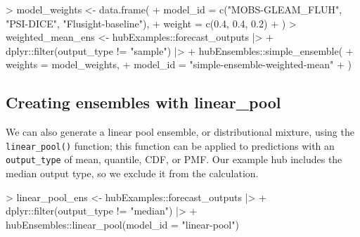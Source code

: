 \documentclass[
  letterpaper,
  DIV=11,
  numbers=noendperiod]{scrartcl}
\newenvironment{Shaded}{\begin{snugshade}}{\end{snugshade}}
\newcommand{\AttributeTok}[1]{\textcolor[rgb]{0.40,0.45,0.13}{#1}}
\newcommand{\FloatTok}[1]{\textcolor[rgb]{0.68,0.00,0.00}{#1}}
\newcommand{\FunctionTok}[1]{\textcolor[rgb]{0.28,0.35,0.67}{#1}}
\newcommand{\NormalTok}[1]{\textcolor[rgb]{0.00,0.23,0.31}{#1}}
\newcommand{\OtherTok}[1]{\textcolor[rgb]{0.00,0.23,0.31}{#1}}
\newcommand{\SpecialCharTok}[1]{\textcolor[rgb]{0.37,0.37,0.37}{#1}}
\newcommand{\StringTok}[1]{\textcolor[rgb]{0.13,0.47,0.30}{#1}}
\begin{document}
\begin{Shaded}
\begin{Highlighting}[]
\SpecialCharTok{\textgreater{}}\NormalTok{ model\_weights }\OtherTok{\textless{}{-}} \FunctionTok{data.frame}\NormalTok{(}
\SpecialCharTok{+}     \AttributeTok{model\_id =} \FunctionTok{c}\NormalTok{(}\StringTok{"MOBS{-}GLEAM\_FLUH"}\NormalTok{, }\StringTok{"PSI{-}DICE"}\NormalTok{, }\StringTok{"Flusight{-}baseline"}\NormalTok{),}
\SpecialCharTok{+}     \AttributeTok{weight =} \FunctionTok{c}\NormalTok{(}\FloatTok{0.4}\NormalTok{, }\FloatTok{0.4}\NormalTok{, }\FloatTok{0.2}\NormalTok{)}
\SpecialCharTok{+}\NormalTok{   )}
\SpecialCharTok{\textgreater{}}\NormalTok{ weighted\_mean\_ens }\OtherTok{\textless{}{-}}\NormalTok{ hubExamples}\SpecialCharTok{::}\NormalTok{forecast\_outputs }\SpecialCharTok{|\textgreater{}}
\SpecialCharTok{+}\NormalTok{     dplyr}\SpecialCharTok{::}\FunctionTok{filter}\NormalTok{(output\_type }\SpecialCharTok{!=} \StringTok{"sample"}\NormalTok{) }\SpecialCharTok{|\textgreater{}}
\SpecialCharTok{+}\NormalTok{     hubEnsembles}\SpecialCharTok{::}\FunctionTok{simple\_ensemble}\NormalTok{(}
\SpecialCharTok{+}       \AttributeTok{weights =}\NormalTok{ model\_weights,}
\SpecialCharTok{+}       \AttributeTok{model\_id =} \StringTok{"simple{-}ensemble{-}weighted{-}mean"}
\SpecialCharTok{+}\NormalTok{     )}
\end{Highlighting}
\end{Shaded}

\subsection{Creating ensembles with
linear\_pool}\label{creating-ensembles-with-linear_pool}

We can also generate a linear pool ensemble, or distributional mixture,
using the \texttt{linear\_pool()} function; this function can be applied
to predictions with an \texttt{output\_type} of mean, quantile, CDF, or
PMF. Our example hub includes the median output type, so we exclude it
from the calculation.

\begin{Shaded}
\begin{Highlighting}[]
\SpecialCharTok{\textgreater{}}\NormalTok{ linear\_pool\_ens }\OtherTok{\textless{}{-}}\NormalTok{ hubExamples}\SpecialCharTok{::}\NormalTok{forecast\_outputs }\SpecialCharTok{|\textgreater{}}
\SpecialCharTok{+}\NormalTok{     dplyr}\SpecialCharTok{::}\FunctionTok{filter}\NormalTok{(output\_type }\SpecialCharTok{!=} \StringTok{"median"}\NormalTok{) }\SpecialCharTok{|\textgreater{}}
\SpecialCharTok{+}\NormalTok{     hubEnsembles}\SpecialCharTok{::}\FunctionTok{linear\_pool}\NormalTok{(}\AttributeTok{model\_id =} \StringTok{"linear{-}pool"}\NormalTok{)}
\end{Highlighting}
\end{Shaded}
\end{document}
